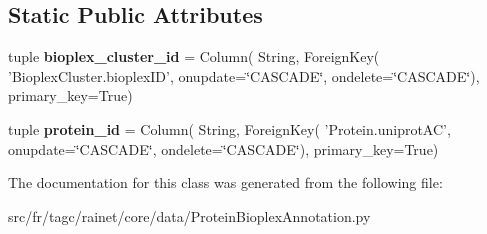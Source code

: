 \subsection*{Static Public Attributes}
\begin{DoxyCompactItemize}
\item 
\hypertarget{classsrc_1_1fr_1_1tagc_1_1rainet_1_1core_1_1data_1_1ProteinBioplexAnnotation_1_1ProteinBioplexAnnotation_a537e28305e47ff58c285479b77524cef}{tuple {\bfseries bioplex\-\_\-cluster\-\_\-id} = Column( String, Foreign\-Key( 'Bioplex\-Cluster.\-bioplex\-I\-D', onupdate=\char`\"{}C\-A\-S\-C\-A\-D\-E\char`\"{}, ondelete=\char`\"{}C\-A\-S\-C\-A\-D\-E\char`\"{}), primary\-\_\-key=True)}\label{classsrc_1_1fr_1_1tagc_1_1rainet_1_1core_1_1data_1_1ProteinBioplexAnnotation_1_1ProteinBioplexAnnotation_a537e28305e47ff58c285479b77524cef}

\item 
\hypertarget{classsrc_1_1fr_1_1tagc_1_1rainet_1_1core_1_1data_1_1ProteinBioplexAnnotation_1_1ProteinBioplexAnnotation_a767bb4aff47f63ebf9fe1dd12e98a36a}{tuple {\bfseries protein\-\_\-id} = Column( String, Foreign\-Key( 'Protein.\-uniprot\-A\-C', onupdate=\char`\"{}C\-A\-S\-C\-A\-D\-E\char`\"{}, ondelete=\char`\"{}C\-A\-S\-C\-A\-D\-E\char`\"{}), primary\-\_\-key=True)}\label{classsrc_1_1fr_1_1tagc_1_1rainet_1_1core_1_1data_1_1ProteinBioplexAnnotation_1_1ProteinBioplexAnnotation_a767bb4aff47f63ebf9fe1dd12e98a36a}

\end{DoxyCompactItemize}


The documentation for this class was generated from the following file\-:\begin{DoxyCompactItemize}
\item 
src/fr/tagc/rainet/core/data/Protein\-Bioplex\-Annotation.\-py\end{DoxyCompactItemize}

